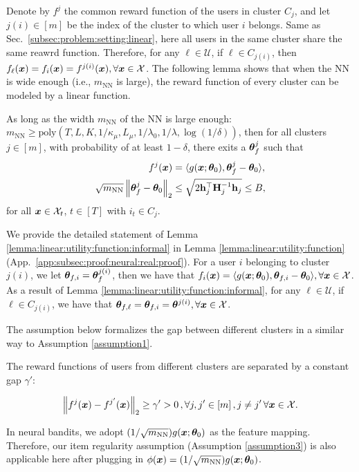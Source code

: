 Denote by \( f^j \) the common reward function of the users in cluster \( C_j \), and let \( j(i) \in [m] \) be the index of the cluster to which user \( i \) belongs. 
Same as Sec.~\ref{subsec:problem:setting:linear}, here all users in the same cluster share the same reawrd function.
Therefore, for any \( \ell \in \mathcal{U} \), if \( \ell \in C_{j(i)} \), then \( f_\ell(\boldsymbol{x}) = f_i(\boldsymbol{x}) = f^{j(i)}(\boldsymbol{x}),\forall \boldsymbol{x}\in\mathcal{X} \).
The following lemma shows that when the NN is wide enough (i.e., $m_{\text{NN}}$ is large), the reward function of every cluster can be modeled by a linear function.
\begin{lemma}
\label{lemma:linear:utility:function:informal}
As long as the width $m_{\text{NN}}$ of the NN is large enough: $m_{\text{NN}} \geq \text{poly}(T, L, K, 1/\kappa_\mu, L_\mu, 1/\lambda_0, 1/\lambda, \log(1/\delta))$,
then for all clusters $j\in[m]$,
with probability of at least $1-\delta$, there exits a $\boldsymbol{\theta}^j_{f}$ such that 
\begin{align*}
	f^j(\boldsymbol{x}) &= \langle g(\boldsymbol{x};\boldsymbol{\theta}_0), \boldsymbol{\theta}^j_{f} - \boldsymbol{\theta}_0 \rangle, \\
    \sqrt{m_{\text{NN}}} \left\| \boldsymbol{\theta}^j_{f} - \boldsymbol{\theta}_0 \right\|_2 &\leq \sqrt{2\mathbf{h}_j^{\top} \mathbf{H}_j^{-1} \mathbf{h}_j} \leq B,
\end{align*}
for all $\boldsymbol{x}\in\mathcal{X}_{t}$, $t\in[T]$ with $i_t\in C_{j}$.
\end{lemma}
We provide the detailed statement of Lemma \ref{lemma:linear:utility:function:informal} in Lemma \ref{lemma:linear:utility:function} (App.~\ref{app:subsec:proof:neural:real:proof}).
For a user $i$ belonging to cluster $j(i)$, we let $\boldsymbol{\theta}_{f,i}=\boldsymbol{\theta}^{j(i)}_{f}$, then we have that $f_i(\boldsymbol{x}) = \langle g(\boldsymbol{x};\boldsymbol{\theta}_0), \boldsymbol{\theta}_{f,i} - \boldsymbol{\theta}_0 \rangle,\forall \boldsymbol{x}\in\mathcal{X}$.
As a result of Lemma \ref{lemma:linear:utility:function:informal}, for any \( \ell \in \mathcal{U} \), if \( \ell \in C_{j(i)} \), we have that \( \boldsymbol{\theta}_{f,\ell} = \boldsymbol{\theta}_{f,i} = \boldsymbol{\theta}^{j(i)},\forall \boldsymbol{x}\in\mathcal{X} \).

The assumption below formalizes the gap between different clusters in a similar way to Assumption \ref{assumption1}.
\begin{assumption}
\label{assumption:gap:neural:bandits}
The reward functions of users from different clusters are separated by a constant gap $\gamma'$:
\begin{small}
\begin{equation*}
    \left\| f^{j}(\boldsymbol{x})-f^{j^{\prime}}(\boldsymbol{x}) \right\|_2\geq \gamma'>0\,, \forall{j,j^{\prime}\in [m]\,, j\neq j^{\prime}}\,\forall \boldsymbol{x}\in\mathcal{X}.
\end{equation*}  
\end{small}
\end{assumption}

In neural bandits, we adopt $(1 / \sqrt{m_{\text{NN}}})g(\boldsymbol{x};\boldsymbol{\theta}_0)$ as the feature mapping. Therefore, our item regularity assumption (Assumption \ref{assumption3}) is also applicable here after plugging in $\phi(\boldsymbol{x}) = (1 / \sqrt{m_{\text{NN}}})g(\boldsymbol{x};\boldsymbol{\theta}_0)$.
